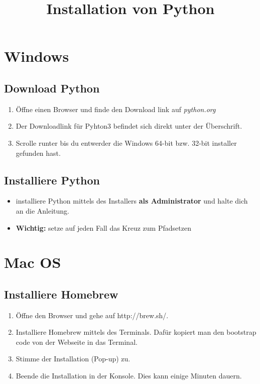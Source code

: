 \documentclass[accentcolor=tud3c,colorbacktitle,12pt]{tudexercise}
\title{Installation von Python}
\subtitle{\Author}
\begin{document}
\maketitle



\section*{Windows}
\subsection*{Download Python}
\begin{enumerate}
	\item Öffne einen Browser und finde den Download link auf \textit{python.org}
	\item Der Downloadlink für Pyhton3 befindet sich direkt unter der Überschrift.
	\item Scrolle runter bis du entwerder die Windows 64-bit bzw. 32-bit installer gefunden hast.
\end{enumerate}
\subsection*{Installiere Python}
\begin{itemize}
	\item installiere Python mittels des Installers \textbf{als Administrator} und halte dich an die Anleitung. 
	\item \textbf{Wichtig:} setze auf jeden Fall das Kreuz zum Pfadsetzen
\end{itemize}

\section*{Mac OS}
\subsection*{Installiere Homebrew}
\begin{enumerate}
	\item Öffne den Browser und gehe auf http://brew.sh/. \item Installiere Homebrew mittels des Terminals. Dafür kopiert man den bootstrap code von der Webseite in das Terminal.
	\item Stimme der Installation (Pop-up) zu.
	\item Beende die Installation in der Konsole. Dies kann einige Minuten dauern.
\end{enumerate}
\end{document}
